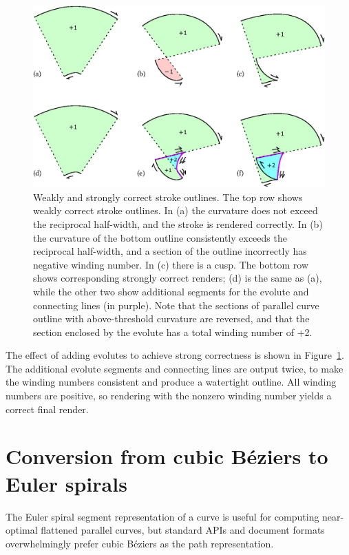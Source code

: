 \documentclass[sigconf, authordraft]{acmart}
\begin{document}
\begin{figure}
    \includegraphics[scale=0.6]{evolute_fig}
    \caption{Weakly and strongly correct stroke outlines. The top row shows weakly correct stroke outlines. In (a) the curvature does not exceed the reciprocal half-width, and the stroke is rendered correctly. In (b) the curvature of the bottom outline consistently exceeds the reciprocal half-width, and a section of the outline incorrectly has negative winding number. In (c) there is a cusp. The bottom row shows corresponding strongly correct renders; (d) is the same as (a), while the other two show additional segments for the evolute and connecting lines (in purple). Note that the sections of parallel curve outline with above-threshold curvature are reversed, and that the section enclosed by the evolute has a total winding number of +2.}
    \label{fig:evolutes}
\end{figure}

The effect of adding evolutes to achieve strong correctness is shown in Figure~\ref{fig:evolutes}. The additional evolute segments and connecting lines are output twice, to make the winding numbers consistent and produce a watertight outline. All winding numbers are positive, so rendering with the nonzero winding number yields a correct final render.

\section{Conversion from cubic Béziers to Euler spirals}

The Euler spiral segment representation of a curve is useful for computing near-optimal flattened parallel curves, but standard APIs and document formats overwhelmingly prefer cubic Béziers as the path representation.
\end{document}
